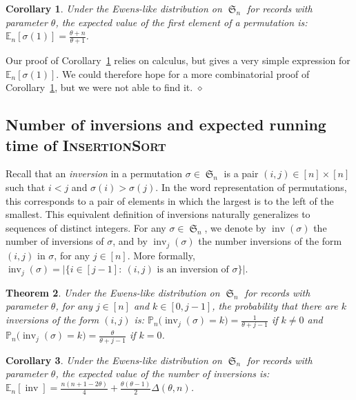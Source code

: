 \documentclass[proceedings]{aofa}
\newcommand{\InsertSort}{\textsc{InsertionSort}\xspace}
\newcommand{\EE}{\mathbb{E}}
\newcommand{\PP}{\mathbb{P}}
\DeclareMathOperator{\sym}{\mathfrak{S}}
\DeclareMathOperator{\inv}{inv}
\newtheorem{theorem}{Theorem}
\newtheorem{corollary}[theorem]{Corollary}
\newenvironment{remark}{\noindent{\bf Remark:} }{\hfill$\diamond$}
\begin{document}
\begin{corollary}\label{thm:first_value}
Under the Ewens-like distribution on $\sym_n$ for records with parameter $\theta$, the expected value of the first element of a permutation is: 
$\EE_{n}[\sigma(1)] = \frac{\theta + n}{\theta + 1}$.
\end{corollary}

\begin{remark}
Our proof of Corollary~\ref{thm:first_value} relies on calculus, but gives a very simple expression for $\EE_{n}[\sigma(1)]$. 
We could therefore hope for a more combinatorial proof of Corollary~\ref{thm:first_value}, but we were not able to find it.
\end{remark}

\subsection{Number of inversions and expected running time of \InsertSort}\label{sec:insertion}

Recall that an \emph{inversion} in a permutation $\sigma\in\sym_{n}$ is a pair $(i,j)\in[n]\times[n]$ such that $i<j$ and $\sigma(i) > \sigma(j)$. 
In the word representation of permutations, this corresponds to a pair of elements in which the largest is to the left of the smallest. 
This equivalent definition of inversions naturally generalizes to sequences of distinct integers. 
For any $\sigma\in\sym_{n}$, we denote by $\inv(\sigma)$ the number of inversions of $\sigma$, 
and by $\inv_j(\sigma)$ the number inversions of the form $(i,j)$ in $\sigma$, for any $j\in [n]$. 
More formally, $\inv_{j}(\sigma) =\big| \{i\in[j-1]:\ (i,j)\text{ is an inversion of }\sigma\}\big|$.


\begin{theorem}\label{lem:inversion_at_j}
Under the Ewens-like distribution on $\sym_n$ for records with parameter $\theta$, 
for any $j \in [n]$ and $k\in[0,j-1]$, 
the probability that there are $k$ inversions of the form $(i,j)$ is: 
$\PP_{n}\big(\inv_j(\sigma) =k\big) =  \frac{1}{\theta+j-1}$ if $k\neq 0$ 
and $\PP_{n}\big(\inv_j(\sigma) =k\big) =\frac{\theta}{\theta+j-1}$ if $k=0$. 
\end{theorem}

\begin{corollary}\label{thm:nb_of_inversions}
Under the Ewens-like distribution on $\sym_n$ for records with parameter $\theta$, the expected value of the number of inversions is: 
$\EE_{n}[\inv] = \frac{n(n + 1-2\theta)}4 + \frac{\theta(\theta-1)}{2}\Delta(\theta,n)$.
\end{corollary}
\end{document}
